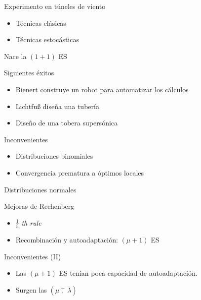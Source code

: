 \documentclass[10pt]{beamer}
\begin{document}
\begin{frame}{Experimento en túneles de viento}
  \begin{itemize}\itemsep2pt
  \item Técnicas clásicas
  \item Técnicas estocásticas
  \end{itemize}

  \begin{center}
    Nace la $(1 + 1)$ ES
  \end{center}
\end{frame}

\begin{frame}{Siguientes éxitos}
  \begin{itemize}\itemsep2pt
  \item Bienert construye un robot para automatizar los cálculos
  \item Lichtfu{\ss} diseña una tubería
  \item Diseño de una tobera supersónica
  \end{itemize}
\end{frame}

\begin{frame}{Inconvenientes}
  \begin{itemize}\itemsep2pt
  \item Distribuciones binomiales
  \item Convergencia prematura a óptimos locales
  \end{itemize}

  \begin{center}
    Distribuciones normales
  \end{center}
\end{frame}

\begin{frame}{Mejoras de Rechenberg}
  \begin{itemize}\itemsep2pt
  \item $\frac{1}{5}$ \emph{th rule}
  \item Recombinación y autoadaptación: $(\mu + 1)$ ES
  \end{itemize}
\end{frame}

\begin{frame}{Inconvenientes (II)}
  \begin{itemize}[<+- | alert@+>]
  \item Las $(\mu + 1)$ ES tenían poca capacidad de autoadaptación.
  \item Surgen las $\left( \mu \ \overset{+}{,} \ \lambda \right)$
  \end{itemize}
\end{frame}
\end{document}
